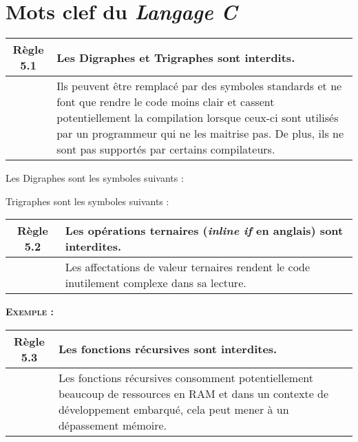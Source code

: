 \section{Mots clef du \textit{Langage C}}

\begin{center}
\begin{tabular}{|c p{12.3cm}|}
\hline
\rowcolor{red!10}\textbf{Règle 5.1} & Les Digraphes et Trigraphes sont interdits. \\ \hline
 & Ils peuvent être remplacé par des symboles standards et ne font que rendre le code moins clair et cassent potentiellement la compilation lorsque ceux-ci sont utilisés par un programmeur qui ne les maitrise pas. De plus, ils ne sont pas supportés par certains compilateurs. \\ \hline
\hline
\end{tabular}
\end{center}

\smallskip 

Les Digraphes sont les symboles suivants :
\smallskip 



Trigraphes sont les symboles suivants :
\smallskip 


\medskip

\begin{center}
\begin{tabular}{|c p{12.3cm}|}
\hline
\rowcolor{red!10}\textbf{Règle 5.2} & Les opérations ternaires (\textit{inline if} en anglais) sont interdites. \\ \hline
 & Les affectations de valeur ternaires rendent le code inutilement complexe dans sa lecture.\\ \hline
\hline
\end{tabular}
\end{center}

\pagebreak

\begin{large}
\textbf{\textsc{Exemple :}}
\end{large}
\smallskip


\medskip

\begin{center}
\begin{tabular}{|c p{12.3cm}|}
\hline
\rowcolor{red!10}\textbf{Règle 5.3} & Les fonctions récursives sont interdites. \\ \hline
 & Les fonctions récursives consomment potentiellement beaucoup de ressources en RAM et dans un contexte de développement embarqué, cela peut mener à un dépassement mémoire.\\ \hline
\hline
\end{tabular}
\end{center}


